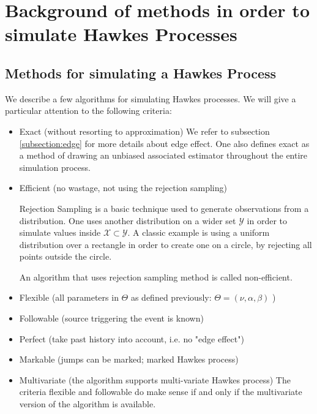 \chapter{Background of methods in order to simulate Hawkes Processes}
\label{appendix_simulate}


\section{Methods for simulating a Hawkes Process}
\label{section:definition_algo}
We describe a few algorithms for simulating Hawkes processes. We will give a particular attention to the following criteria:

\begin{itemize}
\setlength{\itemindent}{2 cm}
\item Exact (without resorting to approximation)
We refer to subsection \ref{subsection:edge} for more details about edge effect. One also defines exact as a method of drawing an unbiased associated estimator throughout the entire simulation process. 
\item Efficient (no wastage, not using the rejection sampling)

\begin{definition}
Rejection Sampling is a basic technique used to generate observations from a distribution. One uses another distribution on a wider set $\mathcal Y$ in order to simulate values inside $\mathcal X \subset \mathcal Y$. A classic example is using a uniform distribution over a rectangle in order to create one on a circle, by rejecting all points outside the circle. 
\end{definition}

An algorithm that uses rejection sampling method is called non-efficient. 

\item Flexible (all parameters in $\Theta$ as defined previously: $ \Theta = ( \nu, \alpha, \beta ) $ )
\item Followable (source triggering the event is known)
\item Perfect (take past history into account, i.e. no "edge effect")
\item Markable (jumps can be marked; marked Hawkes process)
\item Multivariate (the algorithm supports multi-variate Hawkes process)
The criteria flexible and followable do make sense if and only if the multivariate version of the algorithm is available.
\end{itemize}


